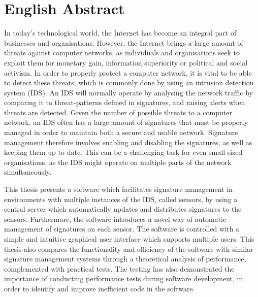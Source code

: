 \chapter*{English Abstract}

In today's technological world, the Internet has become an integral part of
businesses and organisations. However, the Internet brings a large amount of
threats against computer networks, as individuals and organisations seek to
exploit them for monetary gain, information superiority or political and social
activism. In order to properly protect a computer network, it is vital to be
able to detect these threats, which is commonly done by using an intrusion detection
system (IDS). An IDS will normally operate by analysing the network traffic by
comparing it to threat-patterns defined in signatures, and raising alerts when
threats are detected. Given the number of possible threats to a computer
network, an IDS often has a large amount of signatures that must be properly
managed in order to maintain both a secure and usable network. Signature
management therefore involves enabling and disabling the signatures, as well as
keeping them up to date. This can be a challenging task for even small-sized
organisations, as the IDS might operate on multiple parts of the network
simultaneously.

This thesis presents a software which facilitates signature management in
environments with multiple instances of the IDS, called sensors, by using a
central server which automatically updates and distributes signatures to the
sensors. Furthermore, the software introduces a novel way of automatic
management of signatures on each sensor. The software is controlled with a
simple and intuitive graphical user interface which supports multiple users.
This thesis also compares the functionality and efficiency of the software with
similar signature management systems through a theoretical analysis of
performance, complemented with practical tests. The testing has also
demonstrated the importance of conducting performance tests during software
development, in order to identify and improve inefficient code in the software.